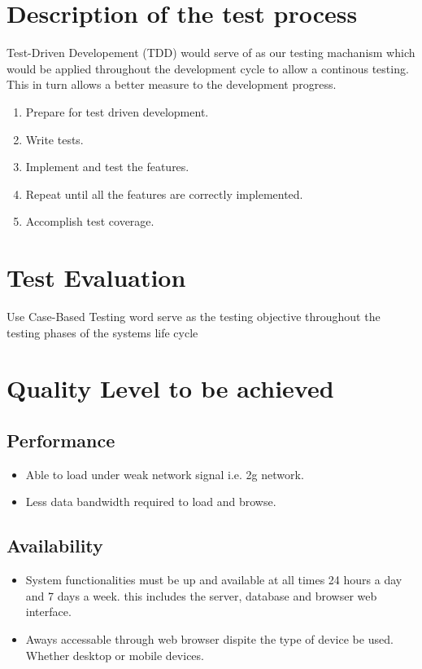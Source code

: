 \documentclass[a4paper,12pt]{article}
\begin{document}
\section{Description of the test process}
	Test-Driven Developement (TDD) would serve of as our testing machanism which would be applied throughout the development cycle to allow a continous testing. This in turn allows a better measure to the development progress.
	\begin{enumerate}
	\item Prepare for test driven development.
	\item Write tests.
	\item Implement and test the features.
	\item Repeat until all the features are correctly implemented.
	\item Accomplish test coverage. 
	\end{enumerate}
\section{Test Evaluation}
Use Case-Based Testing word serve as the testing objective throughout the testing phases of the systems life cycle

\section{Quality Level to be achieved}
	\subsection{Performance}
		\begin{itemize}
		\item Able to load under weak network signal i.e. 2g network.
		\item Less data bandwidth required to load and browse.
		\end{itemize}
	\subsection{Availability}
		\begin{itemize}
		\item System functionalities must be up and available at all times 24 hours a day and 7 days a week. this includes the server, database and browser web interface.
		\item Aways accessable through web browser dispite the type of device be used. Whether desktop or mobile devices.
		\end{itemize}
\end{document}
